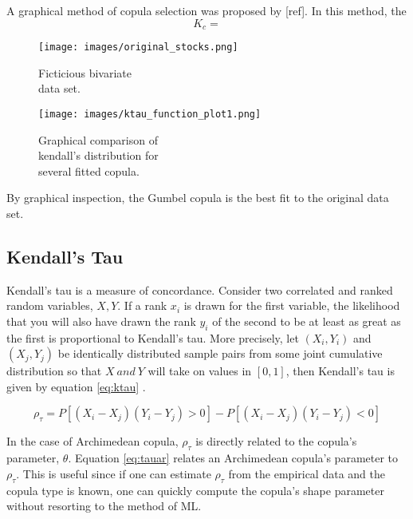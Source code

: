 A graphical method of copula selection was proposed by [ref].  In this method, the 
\begin{equation}
K_c = 
\end{equation}

\begin{figure}[!htbp]
\centering
\begin{minipage}{.45\textwidth}
  \texttt{[image: images/original\_stocks.png]}
\caption{Ficticious bivariate \\ data set.}
\label{fig:biv_data_ex}
\end{minipage}%
\begin{minipage}{.45\textwidth}
  \texttt{[image: images/ktau\_function\_plot1.png]}
\caption{Graphical comparison of  \\ kendall's distribution for \\ several fitted copula.}
\label{fig:kc_fn_compare}
\end{minipage}
\end{figure}
By graphical inspection, the Gumbel copula is the best fit to the original data set.

\subsection*{Kendall's Tau}

Kendall's tau is a measure of concordance.  Consider two correlated and ranked random variables, $X, Y$.
If a rank $x_i$ is drawn for the first variable, the likelihood that you will also have drawn the rank $y_i$ of the second to be at least as great as the first is proportional to Kendall's tau.  More precisely, let $(X_i, Y_i)$ and $(X_j, Y_j)$ be identically distributed sample pairs from some joint cumulative distribution so that $X\ and\ Y$ will take on values in $[0,1]$, then Kendall's tau is given by equation \ref{eq:ktau} \cite{Nelsen2006}.  

\begin{equation}
\rho_\tau = P[(X_i - X_j)(Y_i-Y_j)>0] - P[(X_i - X_j)(Y_i - Y_j)<0]
\label{eq:ktau}
\end{equation}

In the case of Archimedean copula, $\rho_\tau$ is directly related to the copula's parameter, $\theta$.
Equation \ref{eq:tauar} relates an Archimedean copula's parameter to $\rho_\tau$.  This is useful since if one can estimate $\rho_\tau$ from the empirical data and the copula type is known, one can quickly compute the copula's shape parameter without resorting to the method of ML.

